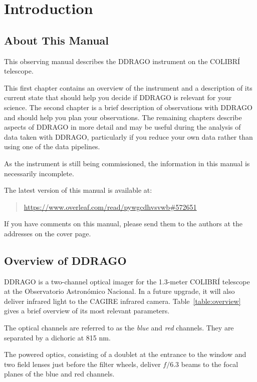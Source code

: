 \chapter{Introduction}

\section{About This Manual}

This observing manual describes the DDRAGO instrument on the COLIBRÍ telescope. 

This first chapter contains an overview of the instrument and a description of its current state that should help you decide if DDRAGO is relevant for your science. The second chapter is a brief description of observations with DDRAGO and should help you plan your observations. The remaining chapters describe aspects of DDRAGO in more detail and may be useful during the analysis of data taken with DDRAGO, particularly if you reduce your own data rather than using one of the data pipelines.

As the instrument is still being commissioned, the information in this manual is necessarily incomplete.

The latest version of this manual is available at:

\begin{quote}
\url{https://www.overleaf.com/read/pywgcdhvsvwb#572651}
\end{quote}

If you have comments on this manual, please send them to the authors at the addresses on the cover page.

\section{Overview of DDRAGO}

DDRAGO is a two-channel optical imager for the 1.3-meter COLIBRÍ telescope at the Observatorio Astronómico Nacional. In a future upgrade, it will also deliver infrared light to the CAGIRE infrared camera. Table~\ref{table:overview} gives a brief overview of its most relevant parameters.

The optical channels are referred to as the \emph{blue} and \emph{red} channels. They are separated by a dichoric at 815 nm. 

The powered optics, consisting of a doublet at the entrance to the window and two field lenses just before the filter wheels, deliver $f/6.3$ beams to the focal planes of the blue and red channels.

